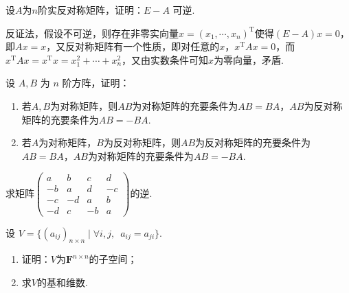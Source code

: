 \begin{exercise}
\begin{exgroup}
\begin{answer}
        \end{answer}

        \item 设$A$为$n$阶实反对称矩阵，证明：$E-A$ 可逆.
        \begin{answer}
            反证法，假设不可逆，则存在非零实向量$x=(x_1,\cdots,x_n)^\mathrm{T}$使得$(E-A)x=0$，即$Ax=x$，又反对称矩阵有一个性质，即对任意的$x$，$x^\mathrm{T}Ax=0$，而$x^\mathrm{T}Ax=x^\mathrm{T}x=x_1^2+\cdots+x_n^2$，又由实数条件可知$x$为零向量，矛盾.
        \end{answer}

        \item 设 $A, B$ 为 $n$ 阶方阵，证明：
        \begin{enumerate}
            \item 若$A,B$为对称矩阵，则$AB$为对称矩阵的充要条件为$AB=BA$，$AB$为反对称矩阵的充要条件为$AB=-BA$.
            \item 若$A$为对称矩阵，$B$为反对称矩阵，则$AB$为反对称矩阵的充要条件为$AB=BA$，$AB$为对称矩阵的充要条件为$AB=-BA$.
        \end{enumerate}
        \begin{answer}

        \end{answer}

        \item 求矩阵$\begin{pmatrix}
                a  & b  & c  & d  \\
                -b & a  & d  & -c \\
                -c & -d & a  & b  \\
                -d & c  & -b & a
            \end{pmatrix}$的逆.
            \begin{answer}

            \end{answer}

        \item 设 $V=\{(a_{ij})_{n \times n} \mid \forall i,j,\enspace a_{ij}=a_{ji}\}$.
        \begin{enumerate}
            \item 证明：$V$为$\mathbf{F}^{n \times n}$的子空间；

            \item 求$V$的基和维数.
        \end{enumerate}
        \begin{answer}


\end{answer}
\end{exgroup}
\end{exercise}
